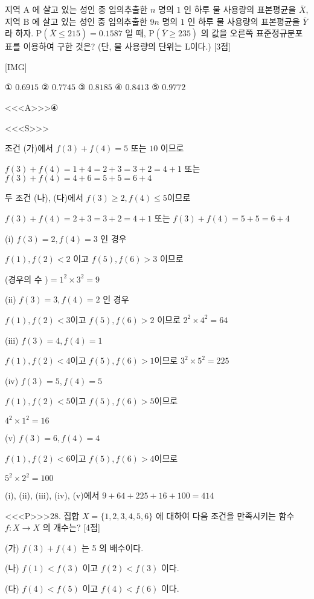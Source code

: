 \documentclass{oblivoir}
\begin{document}
지역 $\mathrm{A}$ 에 살고 있는 성인 중 임의추출한 $n$ 명의 $1$ 인 하루 물 사용량의 표본평균을 $\overline{X}$, 지역 $\mathrm{B}$ 에 살고 있는 성인 중 임의추출한 $9 n$ 명의 $1$ 인 하루 물 사용량의 표본평균을 $\overline{Y}$ 라 하자. $\mathrm{P}(\overline{X} \leq 215)=0.1587$ 일 때, $\mathrm{P}(\overline{Y} \geq 235)$ 의 값을 오른쪽 표준정규분포표를 이용하여 구한 것은? (단, 물 사용량의 단위는 $\mathrm{L}$이다.) [3점]

[IMG]

① $0.6915$
② $0.7745$
③ $0.8185$
④ $0.8413$
⑤ $0.9772$



<<<A>>>④

<<<S>>>



조건 (가)에서 $f(3)+f(4)=5$ 또는 $10$ 이므로

$ f(3)+f(4)=1+4=2+3=3+2=4+1$ 또는 $f(3)+f(4)=4+6=5+5=6+4 $

두 조건 (나), (다)에서 $f(3) \geq 2, f(4) \leq 5 $이므로

$f(3)+f(4)=2+3=3+2=4+1$ 또는 $f(3)+f(4)=5+5=6+4$

(i) $f(3)=2, f(4)=3$ 인 경우

$f(1), f(2)<2$ 이고 $f(5), f(6)>3$ 이므로

(경우의 수 )$=1^{2} \times 3^{2}=9$

(ii) $f(3)=3, f(4)=2$ 인 경우

$f(1), f(2)<3$이고 $f(5), f(6)>2$ 이므로 $2^{2} \times 4^{2}=64$


(iii) $f(3)=4, f(4)=1$

$f(1), f(2)<4$이고 $f(5), f(6)>1 $이므로 $3^{2} \times 5^{2}=225$

(iv) $f(3)=5, f(4)=5$

$f(1), f(2)<5$이고 $f(5), f(6)>5 $이므로

$4^{2} \times 1^{2}=16$

(v) $f(3)=6, f(4)=4$

$f(1), f(2)<6$이고 $f(5), f(6)>4 $이므로 

$5^{2} \times 2^{2}=100$

(i), (ii), (iii), (iv), (v)에서 $ 9+64+225+16+100=414$

<<<P>>>28. 집합 $X=\{1,2,3,4,5,6\}$ 에 대하여 다음 조건을 만족시키는 함수 $f: X \rightarrow X$ 의 개수는? [4점]

(가) $f(3)+f(4)$ 는 5 의 배수이다.

(나) $f(1)<f(3)$ 이고 $f(2)<f(3)$ 이다.

(다) $f(4)<f(5)$ 이고 $f(4)<f(6)$ 이다.
\end{document}
